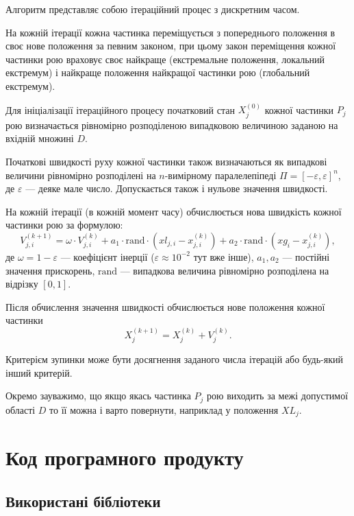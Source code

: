 \documentclass[a4paper, 12pt]{article}
\numberwithin{equation}{section}
\begin{document}
Алгоритм представляє собою ітераційний процес з дискретним часом. \medskip

На кожній ітерації кожна частинка переміщується з попереднього положення в своє нове положення за певним законом, при цьому закон переміщення кожної частинки рою враховує своє найкраще (екстремальне положення, локальний екстремум) і найкраще положення найкращої частинки рою (глобальний екстремум). \medskip

Для ініціалізації ітераційного процесу початковий стан $X_j^{(0)}$ кожної частинки $P_j$ рою визначається рівномірно розподіленою випадковою величиною заданою на вхідній множині $D$. \medskip

Початкові швидкості руху кожної частинки також визначаються як випадкові величини рівномірно розподілені на $n$-вимірному паралелепіпеді $\Pi = [- \varepsilon, \varepsilon]^n$, де $\varepsilon$ --- деяке мале число. Допускається також і нульове значення швидкості. \medskip

На кожній ітерації (в кожній момент часу) обчислюється нова швидкість кожної частинки рою за формулою:
\begin{equation}
    V_{j,i}^{(k + 1)} = \omega \cdot V_{j,i}^{(k)} + a_1 \cdot \text{rand} \cdot \left( xl_{j,i} - x_{j,i}^{(k)} \right) + a_2 \cdot \text{rand} \cdot \left( xg_{i} - x_{j,i}^{(k)} \right),
\end{equation}
де $\omega = 1 - \varepsilon$ --- коефіцієнт інерції ($\varepsilon\approx 10^{-2}$ тут вже інше), $a_1, a_2$ --- постійні значення прискорень, $\text{rand}$ --- випадкова величина рівномірно розподілена на відрізку $[0,1]$. \medskip

Після обчислення значення швидкості обчислюється нове положення кожної частинки 
\begin{equation}
    X_j^{(k + 1)} = X_j^{(k)} + V_j^{(k)}.
\end{equation}

Критерієм зупинки може бути досягнення заданого числа ітерацій або будь-який інший критерій. 

Окремо зауважимо, що якщо якась частинка $P_j$ рою виходить за межі допустимої області $D$ то її можна і варто повернути, наприклад у положення $XL_j$.

\section{Код програмного продукту}

\subsection{Використані бібліотеки}
\end{document}
